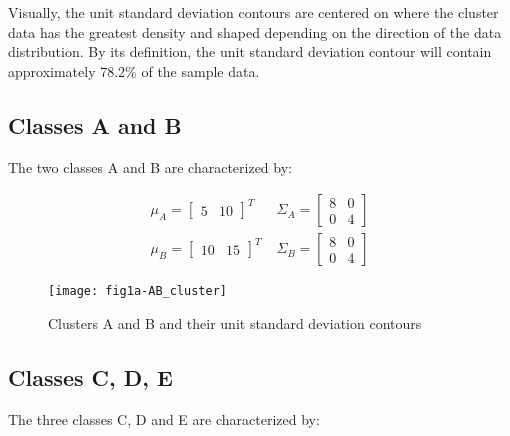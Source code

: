 Visually, the unit standard deviation contours are centered on where the cluster data has the greatest density and shaped depending on the direction of the data distribution. By its definition, the unit standard deviation contour will contain approximately 78.2\% of the sample data.
 
 \subsection{Classes A and B}
 The two classes A and B are characterized by:

\begin{eqnarray}
{\mu}_{A}=\left[ \begin{smallmatrix} 5&10 \end{smallmatrix}\right]^{T} \; & {\Sigma}_{A}=\left[ \begin{smallmatrix} 8&0 \\ 0&4 \end{smallmatrix}\right] \nonumber\\
{\mu}_{B}=\left[ \begin{smallmatrix} 10&15 \end{smallmatrix}\right]^{T} \; & {\Sigma}_{B}=\left[ \begin{smallmatrix} 8&0 \\ 0&4 \end{smallmatrix}\right] \nonumber
\end{eqnarray}

\begin{figure}[ht]
\centering
	\texttt{[image: fig1a-AB\_cluster]}
	\label{fig:clustersDataAB}
	\caption{Clusters A and B and their unit standard deviation contours}
\end{figure}

 \subsection{Classes C, D, E}
 The three classes C, D and E are characterized by:
 
